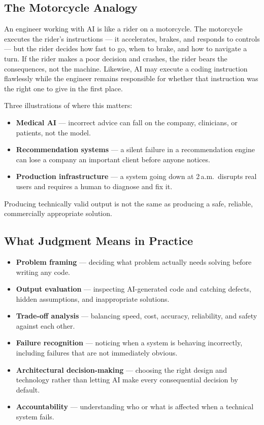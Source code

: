 \subsection{The Motorcycle Analogy}

An engineer working with AI is like a rider on a motorcycle. The motorcycle executes the rider's instructions ---
it accelerates, brakes, and responds to controls --- but the rider decides how fast to go, when to brake, and how
to navigate a turn. If the rider makes a poor decision and crashes, the rider bears the consequences, not the
machine. Likewise, AI may execute a coding instruction flawlessly while the engineer remains responsible for
whether that instruction was the right one to give in the first place.

Three illustrations of where this matters:

\begin{itemize}
  \item \textbf{Medical AI} --- incorrect advice can fall on the company, clinicians, or patients, not the model.
  \item \textbf{Recommendation systems} --- a silent failure in a recommendation engine can lose a company an
  important client before anyone notices.
  \item \textbf{Production infrastructure} --- a system going down at 2\,a.m.\ disrupts real users and requires a
  human to diagnose and fix it.
\end{itemize}

Producing technically valid output is not the same as producing a safe, reliable, commercially appropriate
solution.

\subsection{What Judgment Means in Practice}

\begin{itemize}
  \item \textbf{Problem framing} --- deciding what problem actually needs solving before writing any code.
  \item \textbf{Output evaluation} --- inspecting AI-generated code and catching defects, hidden assumptions, and
  inappropriate solutions.
  \item \textbf{Trade-off analysis} --- balancing speed, cost, accuracy, reliability, and safety against each other.
  \item \textbf{Failure recognition} --- noticing when a system is behaving incorrectly, including failures that
  are not immediately obvious.
  \item \textbf{Architectural decision-making} --- choosing the right design and technology rather than letting
  AI make every consequential decision by default.
  \item \textbf{Accountability} --- understanding who or what is affected when a technical system fails.
\end{itemize}

